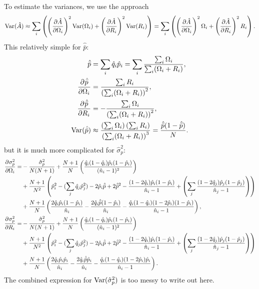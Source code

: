 \documentclass[12pt]{article}
\begin{document}
To estimate the variances, we use the approach
%
\begin{equation}\label{eq:estvarest}
  \var(\hat{A}) \approx \sum_i\prn{ \pdiffc{\hat{A}}{\Omega_i}^2 \var(\Omega_i) + \pdiffc{\hat{A}}{R_i}^2 \var(R_i) } = \sum_i\prn{ \pdiffc{\hat{A}}{\Omega_i}^2 \Omega_i + \pdiffc{\hat{A}}{R_i}^2 R_i }.
\end{equation}
%
This relatively simple for $\hat{\bar{p}}$:
%
\begin{equation}\label{eq:varpbar}
  \begin{aligned}
    \hat{\bar{p}} &= \sum_i \hat{q}_i \hat{p}_i = \sum_i \frac{\sum_i\Omega_i}{\sum_i(\Omega_i+R_i)}, \\
    \pdiff{\hat{\bar{p}}}{\Omega_i}  &= \frac{\sum_iR_i}{\prn{\sum_i(\Omega_i+R_i)}^2},\\
    \pdiff{\hat{\bar{p}}}{R_i}  &= -\frac{\sum_i\Omega_i}{\prn{\sum_i(\Omega_i+R_i)}^2},\\
    \var(\hat{\bar{p}}) &\approx \frac{\prn{\sum_i\Omega_i}\prn{\sum_iR_i}}{\prn{\sum_i(\Omega_i+R_i)}^3} = \frac{\hat{\bar{p}}(1-\hat{\bar{p}})}{N}.
  \end{aligned}
\end{equation}
%
but it is much more complicated for $\hat{\sigma}_p^2$:
%
\begin{equation}\label{eq:varsigmap}
  \begin{aligned}
    \pdiff{\sigma_p^2}{\Omega_i} =& -\frac{\hat{\sigma}_p^2}{N(N+1)} + \frac{N+1}{N} \prn{\frac{\hat{q}_i (1-\hat{q}_i) \hat{p}_i (1-\hat{p}_i)} {(\hat{n}_i-1)^2}} 
    \\ &+ 
    \frac{N+1}{N^2} \prn{ \hat{p}_i^2 - (\sum_j \hat{q}_j\hat{p}_j^2) - 2 \hat{p}_i\hat{\bar{p}} + 2 \hat{\bar{p}}^2 - \frac{(1-2\hat{q}_i) \hat{p}_i (1-\hat{p}_i)} {\hat{n}_i-1} + \prn{\sum_j \frac{(1-2\hat{q}_j) \hat{p}_j (1-\hat{p}_j)} {\hat{n}_j-1} }
    }\\&+ 
    \frac{N+1}{N} \prn{  \frac{2\hat{q}_i \hat{p}_i (1-\hat{p}_i)} {\hat{n}_i} - \frac{2\hat{q}_i \hat{\bar{p}} (1-\hat{p}_i)} {\hat{n}_i} -  \frac{\hat{q}_i(1-\hat{q}_i) (1-2\hat{p}_i) (1-\hat{p}_i)} {\hat{n}_i-1}
    },\\
    \pdiff{\sigma_p^2}{R_i} =&
    -\frac{\hat{\sigma}_p^2}{N(N+1)} + \frac{N+1}{N} \prn{\frac{\hat{q}_i (1-\hat{q}_i) \hat{p}_i (1-\hat{p}_i)} {(\hat{n}_i-1)^2}}
    \\ &+
    \frac{N+1}{N^2} \prn{ \hat{p}_i^2 - (\sum_j \hat{q}_j\hat{p}_j^2) - 2 \hat{p}_i\hat{\bar{p}} + 2 \hat{\bar{p}}^2 - \frac{(1-2\hat{q}_i) \hat{p}_i (1-\hat{p}_i)} {\hat{n}_i-1} + \prn{\sum_j \frac{(1-2\hat{q}_j) \hat{p}_j (1-\hat{p}_j)} {\hat{n}_j-1} }
    }\\&+
    \frac{N+1}{N} \prn{  \frac{2\hat{q}_i \hat{p}_i \hat{p}_i} {\hat{n}_i} - \frac{2\hat{q}_i \hat{\bar{p}} \hat{p}_i} {\hat{n}_i} -  \frac{\hat{q}_i(1-\hat{q}_i) (1-2\hat{p}_i) \hat{p}_i} {\hat{n}_i-1}
    }.
  \end{aligned}
\end{equation}
%
The combined expression for $\operatorname{Var}(\hat{\sigma}_p^2)$ is too messy to write out here.
\end{document}
